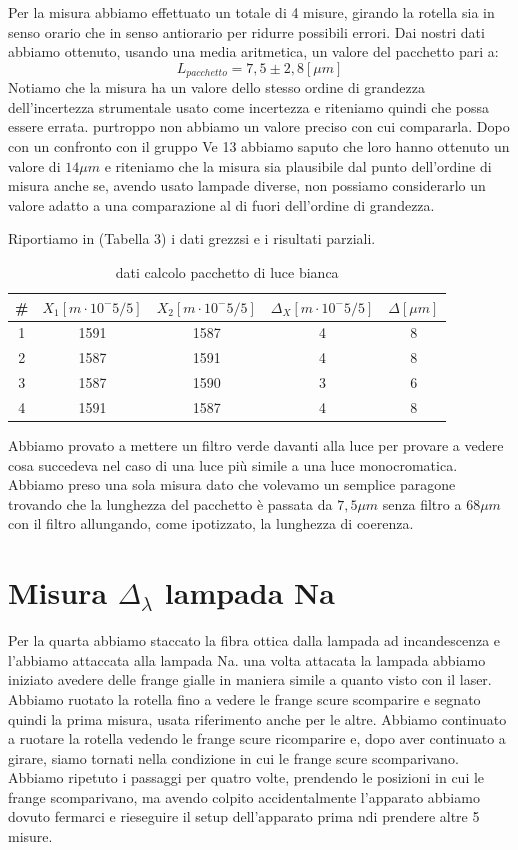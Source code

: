 \documentclass{article}
\begin{document}
Per la misura abbiamo effettuato un totale di 4 misure, girando la rotella sia in senso orario che in senso antiorario per ridurre possibili errori. Dai nostri dati abbiamo ottenuto, usando una media aritmetica, un valore del pacchetto pari a:
\[ L_{pacchetto} = 7,5 \pm 2,8 [\mu m] \]
Notiamo che la misura ha un valore dello stesso ordine di grandezza dell'incertezza strumentale usato come incertezza e riteniamo quindi che possa essere errata. purtroppo non abbiamo un valore preciso con cui compararla. Dopo con un confronto con il gruppo Ve 13 abbiamo saputo che loro hanno ottenuto un valore di $14 \mu m$ e riteniamo che la misura sia plausibile dal punto dell'ordine di misura anche se, avendo usato lampade diverse, non possiamo considerarlo un valore adatto a una comparazione al di fuori dell'ordine di grandezza.

Riportiamo in (Tabella 3) i dati grezzsi e i risultati parziali.


\begin{table}[h!]
\centering
\begin{tabular}{ | c | c | c | c | c | }
\hline
\# & $X_1 [m \cdot 10^-5/5]$ & $X_2 [m \cdot 10^-5/5]$ & $\Delta_X [m \cdot 10^-5/5]$ & $\Delta [\mu m]$\\
\hline
   1 & 1591 & 1587 & 4 & 8\\
   2 & 1587 & 1591 & 4 & 8\\
   3 & 1587 & 1590 & 3 & 6\\
   4 & 1591 & 1587 & 4 & 8\\
\hline
\end{tabular}
\caption{dati calcolo pacchetto di luce bianca}
\label{table:3}
\end{table}


Abbiamo provato a mettere un filtro verde davanti alla luce per provare a vedere cosa succedeva nel caso di una luce più simile a una luce monocromatica. Abbiamo preso una sola misura dato che volevamo un semplice paragone trovando che la lunghezza del pacchetto è passata da $7,5 \mu m$ senza filtro a $68 \mu m$ con il filtro allungando, come ipotizzato, la lunghezza di coerenza.




\section{Misura $\Delta_\lambda$ lampada  Na}
Per la quarta abbiamo staccato la fibra ottica dalla lampada ad incandescenza e l'abbiamo attaccata alla lampada Na. una volta attacata la lampada abbiamo iniziato avedere delle frange gialle in maniera simile a quanto visto con il laser. Abbiamo ruotato la rotella fino a vedere le frange scure scomparire e segnato quindi la prima misura, usata riferimento anche per le altre. Abbiamo continuato a ruotare la rotella vedendo le frange scure ricomparire e, dopo aver continuato a girare, siamo tornati nella condizione in cui le frange scure scomparivano. Abbiamo ripetuto i passaggi per quatro volte, prendendo le posizioni in cui le frange scomparivano, ma avendo colpito accidentalmente l'apparato abbiamo dovuto fermarci e rieseguire il setup dell'apparato prima ndi prendere altre 5 misure.
\end{document}
